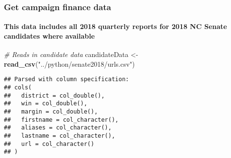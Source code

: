 \documentclass[
]{article}
\newenvironment{Shaded}{\begin{snugshade}}{\end{snugshade}}
\newcommand{\CommentTok}[1]{\textcolor[rgb]{0.56,0.35,0.01}{\textit{#1}}}
\newcommand{\KeywordTok}[1]{\textcolor[rgb]{0.13,0.29,0.53}{\textbf{#1}}}
\newcommand{\NormalTok}[1]{#1}
\newcommand{\StringTok}[1]{\textcolor[rgb]{0.31,0.60,0.02}{#1}}
\begin{document}
\hypertarget{get-campaign-finance-data}{%
\subsubsection{Get campaign finance
data}\label{get-campaign-finance-data}}

\hypertarget{this-data-includes-all-2018-quarterly-reports-for-2018-nc-senate-candidates-where-available}{%
\paragraph{This data includes all 2018 quarterly reports for 2018 NC
Senate candidates where
available}\label{this-data-includes-all-2018-quarterly-reports-for-2018-nc-senate-candidates-where-available}}

\begin{Shaded}
\begin{Highlighting}[]
\CommentTok{# Reads in candidate data}
\NormalTok{candidateData <-}\StringTok{ }\KeywordTok{read_csv}\NormalTok{(}\StringTok{"../python/senate2018/urls.csv"}\NormalTok{)}
\end{Highlighting}
\end{Shaded}

\begin{verbatim}
## Parsed with column specification:
## cols(
##   district = col_double(),
##   win = col_double(),
##   margin = col_double(),
##   firstname = col_character(),
##   aliases = col_character(),
##   lastname = col_character(),
##   url = col_character()
## )
\end{verbatim}
\end{document}
